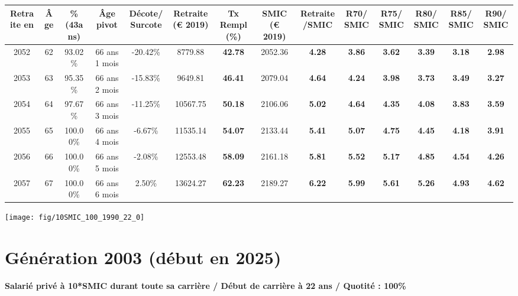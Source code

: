 \begin{adjustbox}{max width=\textwidth} 
\begin{tabular}[htb]{|c|c||c|c|c||c|c||c|c||c|c|c|c|c|} 
\hline 
 Retraite en &  Âge &  \%(43ans) &  Âge pivot &  Décote/Surcote &  Retraite (\euro{} 2019) &  Tx Rempl(\%) &  SMIC (\euro{} 2019) &  Retraite/SMIC &  R70/SMIC &  R75/SMIC &  R80/SMIC &  R85/SMIC &  R90/SMIC \\ 
\hline \hline 
 2052 &  62 &  93.02\% &  66 ans 1 mois &  -20.42\% &  8779.88 &  {\bf 42.78} &  2052.36 &  {\bf 4.28} &  {\bf 3.86} &  {\bf 3.62} &  {\bf 3.39} &  {\bf 3.18} &  {\bf 2.98} \\ 
\hline 
 2053 &  63 &  95.35\% &  66 ans 2 mois &  -15.83\% &  9649.81 &  {\bf 46.41} &  2079.04 &  {\bf 4.64} &  {\bf 4.24} &  {\bf 3.98} &  {\bf 3.73} &  {\bf 3.49} &  {\bf 3.27} \\ 
\hline 
 2054 &  64 &  97.67\% &  66 ans 3 mois &  -11.25\% &  10567.75 &  {\bf 50.18} &  2106.06 &  {\bf 5.02} &  {\bf 4.64} &  {\bf 4.35} &  {\bf 4.08} &  {\bf 3.83} &  {\bf 3.59} \\ 
\hline 
 2055 &  65 &  100.00\% &  66 ans 4 mois &  -6.67\% &  11535.14 &  {\bf 54.07} &  2133.44 &  {\bf 5.41} &  {\bf 5.07} &  {\bf 4.75} &  {\bf 4.45} &  {\bf 4.18} &  {\bf 3.91} \\ 
\hline 
 2056 &  66 &  100.00\% &  66 ans 5 mois &  -2.08\% &  12553.48 &  {\bf 58.09} &  2161.18 &  {\bf 5.81} &  {\bf 5.52} &  {\bf 5.17} &  {\bf 4.85} &  {\bf 4.54} &  {\bf 4.26} \\ 
\hline 
 2057 &  67 &  100.00\% &  66 ans 6 mois &  2.50\% &  13624.27 &  {\bf 62.23} &  2189.27 &  {\bf 6.22} &  {\bf 5.99} &  {\bf 5.61} &  {\bf 5.26} &  {\bf 4.93} &  {\bf 4.62} \\ 
\hline 
\hline 
\end{tabular} 
\end{adjustbox} 
 
 \vspace{0.1cm} 

 {\hspace{-2.2cm}\texttt{[image: fig/10SMIC\_100\_1990\_22\_0]}} 

\newpage 
 
\section{Génération 2003 (début en 2025)\label{10SMIC_100_2003_22_0}} 
 
{\bf \noindent Salarié privé à 10*SMIC durant toute sa carrière / Début de carrière à 22 ans / Quotité : 100\%}  ~ 

